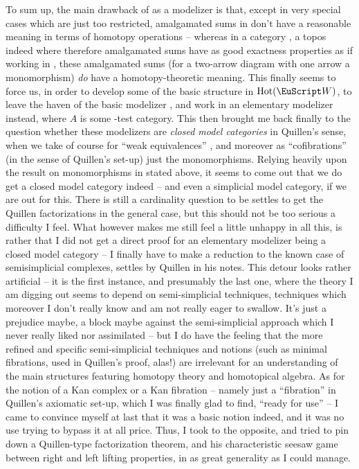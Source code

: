 To sum up, the main drawback of \Cat{} as a modelizer is that, except
in very special cases which are just too restricted, amalgamated sums
in \Cat{} don't have a reasonable meaning in terms of homotopy
operations -- whereas in a category \Ahat, a topos indeed where
therefore amalgamated sums have as good exactness properties as if
working in \Sets, these amalgamated sums (for a two-arrow diagram with
one arrow a monomorphism) \emph{do} have a homotopy-theoretic
meaning. This finally seems to force us, in order to develop some of
the basic structure in $\HotOf(\scrW)$, to leave the haven of the
basic modelizer \Cat, and work in an elementary modelizer \Ahat{}
instead, where $A$ is some \scrW-test category. This then brought me
back finally to the question whether these modelizers are \emph{closed
  model categories} in Quillen's sense, when we take of course for
``weak equivalences'' \scrWA, and moreover as ``cofibrations'' (in the
sense of Quillen's set-up) just the monomorphisms. Relying heavily
upon the result on monomorphisms in \Ahat{} stated above, it seems to
come out that we do get a closed model category indeed -- and even a
simplicial model category, if we are out for this. There is still a
cardinality question to be settles to get the Quillen
factorizations in the general case, but this should not be too serious
a difficulty I feel. What however makes me still feel a little unhappy
in all this, is rather that I did not get a direct proof for an
elementary modelizer being a closed model category -- I finally have
to make a reduction to the known case of semisimplicial complexes,
settles by Quillen in his notes. This detour looks rather artificial
-- it is the first instance, and presumably the last one, where the
theory I am digging out seems to depend on semi-simplicial techniques,
techniques which moreover I don't really know and am not really eager
to swallow. It's just a prejudice maybe, a block maybe against the
semi-simplicial approach which I never really liked nor assimilated --
but I do have the feeling that the more refined and specific
semi-simplicial techniques and notions (such as minimal fibrations,
used in Quillen's proof, alas!) are irrelevant for an understanding of
the main structures featuring homotopy theory and homotopical
algebra. As for the notion of a Kan complex or a Kan fibration --
namely just a ``fibration'' in Quillen's axiomatic set-up, which I was
finally glad to find, ``ready for use'' -- I came to convince myself
at last that it was a basic notion indeed, and it was no use trying to
bypass it at all price. Thus, I took to the opposite, and tried to pin
down a Quillen-type factorization theorem, and his characteristic
seesaw game between right and left lifting properties, in as great
generality as I could manage.

